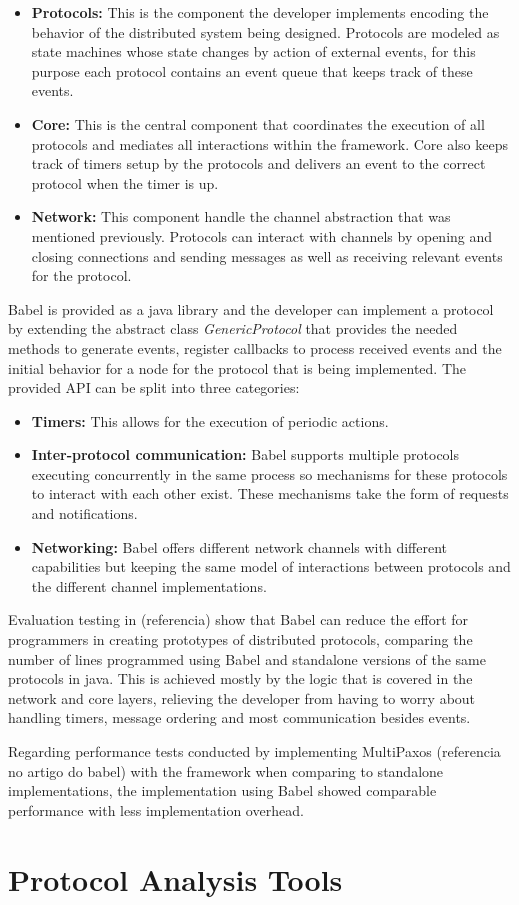 \begin{itemize}
  \item \textbf{Protocols:} This is the component the developer implements encoding
the behavior of the distributed system being designed. Protocols are modeled as
state machines whose state changes by action of external events, for this purpose
each protocol contains an event queue that keeps track of these events.
  \item \textbf{Core:} This is the central component that coordinates the
execution of all protocols and mediates all interactions within the framework.
Core also keeps track of timers setup by the protocols and delivers an event to the
correct protocol when the timer is up.
  \item \textbf{Network:} This component handle the channel abstraction that was
mentioned previously. Protocols can interact with channels by opening and closing connections
and sending messages as well as receiving relevant events for the protocol.
\end{itemize}

Babel is provided as a java library and the developer can implement a protocol
by extending the abstract class \textit{GenericProtocol} that provides the needed
methods to generate events, register callbacks to process received events and 
the initial behavior for a node for the protocol that is being implemented.
The provided API can be split into three categories:

\begin{itemize}
  \item \textbf{Timers:} This allows for the execution of periodic actions.
  \item \textbf{Inter-protocol communication:} Babel supports multiple protocols
executing concurrently in the same process so mechanisms for these protocols
to interact with each other exist. These mechanisms take the form of requests and
notifications.
  \item \textbf{Networking:} Babel offers different network channels with different
capabilities but keeping the same model of interactions between protocols and the
different channel implementations.
\end{itemize}

Evaluation testing in (referencia) show that Babel can reduce the effort for programmers
in creating prototypes of distributed protocols, comparing the number of lines programmed
using Babel and standalone versions of the same protocols in java. This is achieved
mostly by the logic that is covered in the network and core layers, relieving the developer
from having to worry about handling timers, message ordering and most communication besides events.

Regarding performance tests conducted by implementing MultiPaxos (referencia no artigo do babel) with the framework
when comparing to standalone implementations, the implementation using Babel showed comparable performance
with less implementation overhead.

\section{Protocol Analysis Tools}
\label{sec:protocol_analysis_tools}
